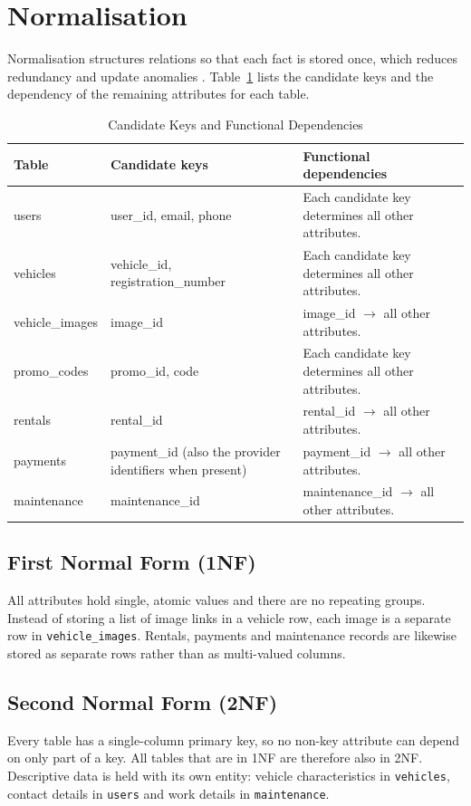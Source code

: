 \documentclass[10pt,a4paper]{report}
\newcommand{\col}[1]{\texttt{#1}}
\begin{document}
\section{Normalisation}
Normalisation structures relations so that each fact is stored once, which reduces redundancy and update anomalies \cite{silberschatz,elmasri}. Table~\ref{tab:fds} lists the candidate keys and the dependency of the remaining attributes for each table.

\begin{table}[htbp]
\centering
\small
\caption{Candidate Keys and Functional Dependencies}
\label{tab:fds}
\begin{tabular}{@{}l>{\raggedright\arraybackslash}p{4.3cm}>{\raggedright\arraybackslash}p{6.2cm}@{}}
\toprule
\textbf{Table} & \textbf{Candidate keys} & \textbf{Functional dependencies} \\
\midrule
users & user\_id, email, phone & Each candidate key determines all other attributes. \\
vehicles & vehicle\_id, registration\_number & Each candidate key determines all other attributes. \\
vehicle\_images & image\_id & image\_id $\rightarrow$ all other attributes. \\
promo\_codes & promo\_id, code & Each candidate key determines all other attributes. \\
rentals & rental\_id & rental\_id $\rightarrow$ all other attributes. \\
payments & payment\_id (also the provider identifiers when present) & payment\_id $\rightarrow$ all other attributes. \\
maintenance & maintenance\_id & maintenance\_id $\rightarrow$ all other attributes. \\
\bottomrule
\end{tabular}
\end{table}

\subsection{First Normal Form (1NF)}
All attributes hold single, atomic values and there are no repeating groups. Instead of storing a list of image links in a vehicle row, each image is a separate row in \col{vehicle_images}. Rentals, payments and maintenance records are likewise stored as separate rows rather than as multi-valued columns.

\subsection{Second Normal Form (2NF)}
Every table has a single-column primary key, so no non-key attribute can depend on only part of a key. All tables that are in 1NF are therefore also in 2NF. Descriptive data is held with its own entity: vehicle characteristics in \col{vehicles}, contact details in \col{users} and work details in \col{maintenance}.
\end{document}
